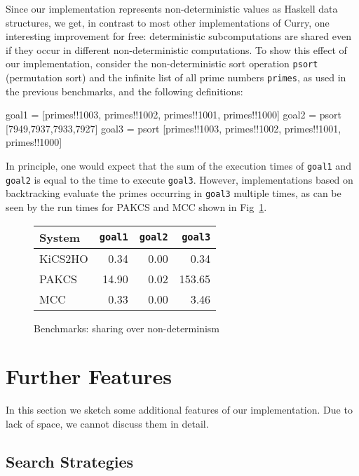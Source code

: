 \documentclass{llncs}
\newcommand{\code}[1]{\mbox{\small\texttt{#1}}}
\begin{document}
Since our implementation represents non-deterministic values
as Haskell data structures, we get, in contrast to most
other implementations of Curry, one interesting improvement for free:
deterministic subcomputations are shared even if they occur
in different non-deterministic computations.
To show this effect of our implementation, consider the
non-deterministic sort operation \code{psort} (permutation sort)
and the infinite list of all prime numbers \code{primes},
as used in the previous benchmarks, and the following definitions:
\begin{curry}
 goal1 = [primes!!1003, primes!!1002, primes!!1001, primes!!1000]
 goal2 = psort [7949,7937,7933,7927]
 goal3 = psort [primes!!1003, primes!!1002, primes!!1001, primes!!1000]
\end{curry}
In principle, one would expect that the sum of the execution times
of \code{goal1} and \code{goal2} is equal to the time to execute
\code{goal3}. However, implementations based on backtracking
evaluate the primes occurring in \code{goal3} multiple times,
as can be seen by the run times for PAKCS and MCC shown
in Fig~\ref{fig:bench-sharing-over-nondet}.
%
\begin{figure}
\centering
\begin{tabular}{|@{~~}l@{~~}|*{3}{@{~~}r@{~~}|}}
\hline
System  & \code{goal1} & \code{goal2} & \code{goal3} \\\hline
KiCS2HO &        0.34  &        0.00  &        0.34  \\
PAKCS   &       14.90  &        0.02  &      153.65  \\
MCC     &        0.33  &        0.00  &        3.46  \\
\hline
\end{tabular}
\caption{Benchmarks: sharing over non-determinism}
 \label{fig:bench-sharing-over-nondet}
\end{figure}


\section{Further Features}
\label{sec:FurtherAspects}

In this section we sketch some additional features of our implementation.
Due to lack of space, we cannot discuss them in detail.

\subsection{Search Strategies}
\end{document}

